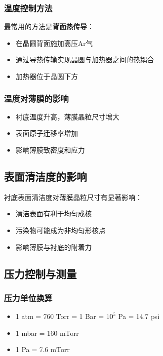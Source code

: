 \documentclass[UTF8,12pt,a4paper]{ctexart}
\begin{document}
\subsubsection{温度控制方法}

最常用的方法是\textbf{背面热传导}：
\begin{itemize}
    \item 在晶圆背面施加高压Ar气
    \item 通过导热传输实现晶圆与加热器之间的热耦合
    \item 加热器位于晶圆下方
\end{itemize}

\subsubsection{温度对薄膜的影响}

\begin{itemize}
    \item 衬底温度升高，薄膜晶粒尺寸增大
    \item 表面原子迁移率增加
    \item 影响薄膜致密度和应力
\end{itemize}

\subsection{表面清洁度的影响}

衬底表面清洁度对薄膜晶粒尺寸有显著影响：
\begin{itemize}
    \item 清洁表面有利于均匀成核
    \item 污染物可能成为非均匀形核点
    \item 影响薄膜与衬底的附着力
\end{itemize}

\subsection{压力控制与测量}

\subsubsection{压力单位换算}

\begin{itemize}
    \item 1 atm = 760 Torr = 1 Bar = $10^5$ Pa = 14.7 psi
    \item 1 mbar = 160 mTorr
    \item 1 Pa = 7.6 mTorr
\end{itemize}
\end{document}
